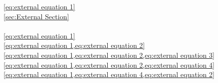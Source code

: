 \documentclass{article}
\begin{document}

  \ref{eq:external equation 1}\\
  \ref{sec:External Section}\\
  \pageref{eq:external equation 1}\\


  \cref{eq:external equation 1}\\
  \cref{eq:external equation 1,eq:external equation 2}\\
  \cref{eq:external equation 1,eq:external equation 2,eq:external equation 3}\\
  \cref{eq:external equation 1,eq:external equation 2,eq:external equation 4}\\
  \cref{eq:external equation 1,eq:external equation 4,eq:external equation 2}\\

  \\
  \\
  \\
  \\
  \\

  \\
\end{document}
